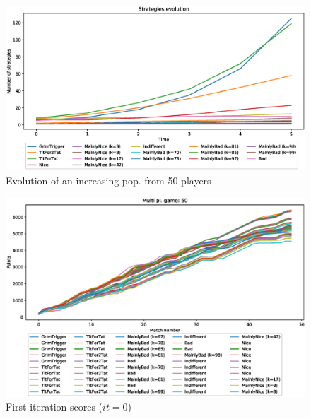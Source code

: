 \documentclass[journal,10pt,twoside]{IEEEtran}
\begin{document}
\begin{figure}[!ht]
    \centering
    \includegraphics[width=.9\columnwidth]{../img/ripdmp-incr/alt1/ripdmp-evolution-increasing-pop-50}
    \caption{Evolution of an increasing pop. from 50 players}
    \label{fig:incrR}
\end{figure}

\begin{figure}[!ht]
    \centering
    \includegraphics[width=1\columnwidth]{../img/ripdmp-incr/alt1/ripdmp-scores-increasing-pop-50-r0}
    \caption{First iteration scores ($it=0$)}
    \label{fig:incrFI}
\end{figure}

\end{document}
